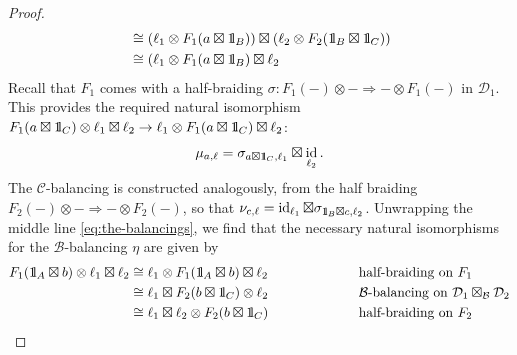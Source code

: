 \documentclass[a4paper]{article}
\numberwithin{equation}{section}
\newcommand{\idty}{{\mathrm{1}\mkern-4mu{\mathchoice{}{}{\mskip-0.5mu}{\mskip-1mu}}\mathrm{l}}}
\newcommand{\1}{{\mathrm{1}\mkern-4mu{\mathchoice{}{}{\mskip-0.5mu}{\mskip-1mu}}\mathrm{l}}}
\newcommand{\B}{\mathcal{B}}
\newcommand{\C}{\mathcal{C}}
\newcommand{\D}{\mathcal{D}}
\DeclareMathOperator{\id}{id}
\begin{document}
\begin{proof}
\begin{equation}
\begin{aligned}
                                                                        &\cong (\ell_1 \otimes F_1(a\boxtimes \idty_B)) \boxtimes (\ell_2 \otimes F_2(\idty_B\boxtimes\idty_C)) \\
                                                                        &\cong (\ell_1 \otimes F_1(a\boxtimes \idty_B) \boxtimes \ell_2
  \end{aligned}
\end{equation}
Recall that $F_1$ comes with a half-braiding $\sigma: F_1(-)\otimes - \Rightarrow -\otimes F_1(-)$ in $\D_1$.
This provides the required natural isomorphism $F_1(a\boxtimes \idty_C)\otimes \ell_1 \boxtimes \ell_2 \to \ell_1 \otimes F_1(a\boxtimes \idty_C)\boxtimes \ell_2$: 
\begin{equation}
  \mu_{a,\ell} = \sigma_{a\boxtimes\idty_C, \ell_1}\boxtimes \id_{\ell_2}.
\end{equation}
The $\C$-balancing is constructed analogously, from the half braiding $F_2(-)\otimes - \Rightarrow - \otimes F_2(-)$, so that $\nu_{c,\ell} = \id_{\ell_1}\boxtimes \sigma_{\idty_B\boxtimes c,\ell_2}$.
Unwrapping the middle line \eqref{eq:the-balancings}, we find that the necessary natural isomorphisms for the $\B$-balancing $\eta$ are given by
\begin{equation}
  \begin{aligned}
    F_1(\idty_A\boxtimes b) \otimes \ell_1 \boxtimes \ell_2 &\cong \ell_1 \otimes F_1(\idty_A \boxtimes b) \boxtimes \ell_2  & & \hspace{2cm}\text{half-braiding on } F_1\\ 
                                                            & \cong \ell_1 \boxtimes F_2(b\boxtimes \idty_C) \otimes \ell_2 && \hspace{2cm}\B\text{-balancing on } \D_1\boxtimes_\B\D_2 \\
                                                            &\cong \ell_1 \boxtimes \ell_2 \otimes F_2(b\boxtimes \idty_C) && \hspace{2cm} \text{half-braiding on } F_2
  \end{aligned}
\end{equation}


\end{proof}
\end{document}
